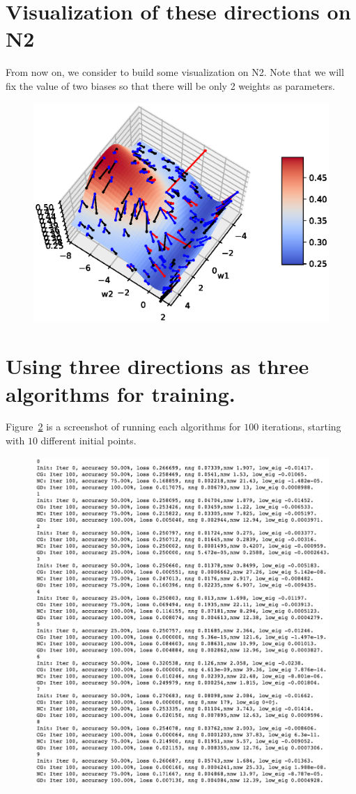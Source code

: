 \documentclass[12pt]{article}
\begin{document}
\section{Visualization of these directions on N2}

From now on, we consider to build some visualization on N2. Note that we will fix the value of two biases so that there will be only 2 weights as parameters.

\begin{figure}[h]
\includegraphics[width=15cm]{2w.eps}
\label{fig:CGvsGD}
\end{figure}

\section{Using three directions as three algorithms for training.}

Figure~\ref{fig:3m} is a screenshot of running each algorithms for $100$ iterations, starting with $10$ different initial points. 
\begin{figure}[h]
\includegraphics[width=16cm]{threeM}
\caption{}
\label{fig:3m}
\end{figure}
\end{document}
